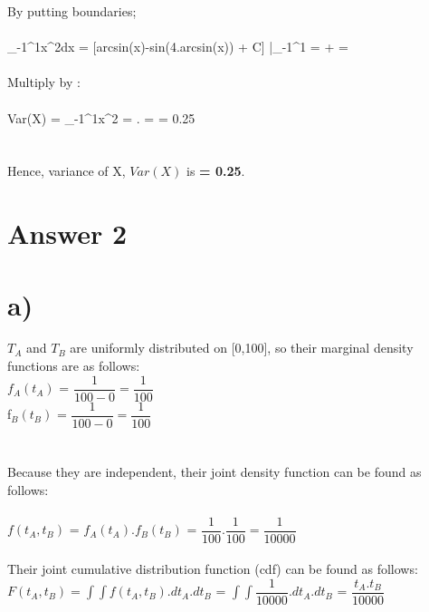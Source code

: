\documentclass[11pt]{article}
\begin{document}
\noindent By putting boundaries; \\ \\

\noindent \int_{-1}^{1}x^2dx = [arcsin(x)-sin(4.arcsin(x)) + C] \big|_{-1}^{1} =  +  =  \\ \\

\noindent Multiply by : \\ \\
Var(X) =  \int_{-1}^{1}x^2 =  . =  = 0.25 \\ \\ \\

\noindent Hence, variance of X, $Var(X)$ is \textbf{ = 0.25}. 




\newpage
\section*{Answer 2}


\section*{a)}
$T_A$ and $T_B$ are uniformly distributed on [0,100], so their marginal density functions are as follows: \\

$f_A(t_A)$ = $\dfrac{1}{100 - 0} = \dfrac{1}{100}$ \\
\indent f$_B(t_B)$ = $\dfrac{1}{100 - 0} = \dfrac{1}{100}$ \\ \\ \\

\noindent Because they are independent, their joint density function can be found as follows: \\ \\
\indent $f(t_A,t_B)$ = $f_A(t_A) . f_B(t_B)$ = $\dfrac{1}{100} . \dfrac{1}{100} = \dfrac{1}{10000}$ \\ \\

\noindent Their joint cumulative distribution function (cdf) can be found as follows: \\

$F(t_A,t_B) = \int \int f(t_A,t_B) . dt_A.dt_B$ = $\int \int \dfrac{1}{10000} .dt_A . dt_B$ = $\dfrac{t_A . t_B}{10000}$ \\
\end{document}
